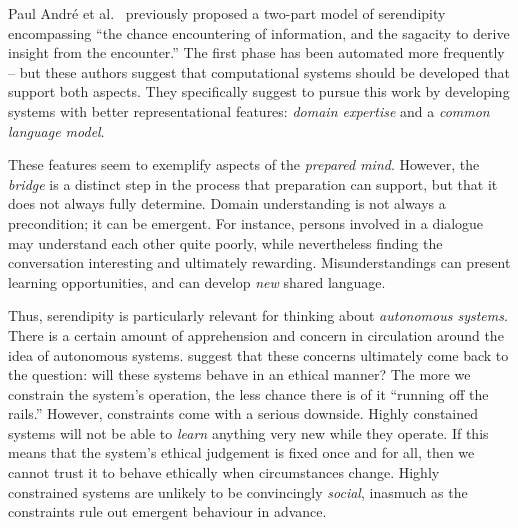 
Paul Andr{\'e} et al.~\cite{andre2009discovery} previously
proposed a two-part model of serendipity encompassing ``the chance
encountering of information, and the sagacity to derive insight from
the encounter.''  The first phase has been automated more frequently
-- but these authors suggest that computational systems should be
developed that support both aspects.  They specifically suggest to
pursue this work by developing systems with better representational
features: \emph{domain expertise} and a \emph{common language model}.

These features seem to exemplify aspects of the \emph{prepared mind}.
However, the \emph{bridge} is a distinct step in the process that
preparation can support, but that it does not always fully determine.
Domain understanding is not always a precondition; it can be emergent.
For instance, persons involved in a dialogue may understand each other
quite poorly, while nevertheless finding the conversation interesting
and ultimately rewarding.  Misunderstandings can present learning
opportunities, and can develop \emph{new} shared language. %


 Thus, serendipity is particularly relevant for thinking about
\emph{autonomous systems}. There is a certain
amount of apprehension and concern in circulation around the idea of
autonomous systems.   suggest that these
concerns ultimately come back to the question: will these systems
behave in an ethical manner?  The more we constrain the system's
operation, the less chance there is of it ``running off the rails.''
However, constraints come with a serious downside.  Highly constained
systems will not be able to \emph{learn} anything very new while they
operate.  If this means that the system's ethical judgement is fixed
once and for all, then we cannot trust it to behave ethically when
circumstances change.  Highly constrained systems are unlikely to be
convincingly \emph{social}, inasmuch as the constraints rule out
emergent behaviour in advance.  

